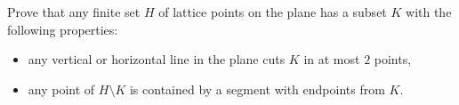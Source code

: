 Prove that any finite set $H$ of lattice points on the plane has a subset $K$ with the following properties:
\begin{itemize}
	\item any vertical or horizontal line in the plane cuts $K$ in at most $2$ points,
	\item any point of $H\setminus K$ is contained by a segment with endpoints from $K$.
\end{itemize}
